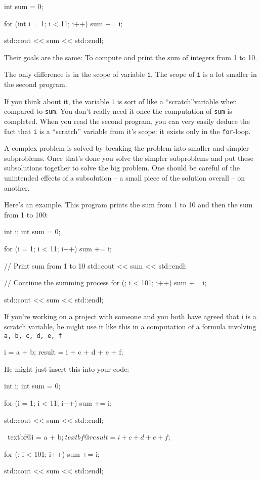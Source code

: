 \begin{console}
int sum = 0;

for (int i = 1; i < 11; i++)
{   
    sum += i;
}

std::cout << sum << std::endl;
\end{console}

Their goals are the same: To compute and print the sum of integers from
1 to 10.

The only difference is in the scope of variable \texttt{i}. The scope of
\texttt{i} is a lot smaller in the second program.

If you think about it, the variable \texttt{i} is sort of like a
``scratch''variable when compared to \texttt{sum}. You
don't really need it once the computation of \texttt{sum}
is completed. When you read the second program, you can very easily
deduce the fact that \texttt{i} is a ``scratch'' variable from
it's scope: it exists only in the \texttt{for}-loop.

A complex problem is solved by breaking the problem into smaller and
simpler subproblems. Once that's done you solve the
simpler subproblems and put these subsolutions together to solve the big
problem. One should be careful of the unintended effects of a
subsolution -- a small piece of the solution overall -- on another.

Here's an example. This program prints the sum from 1 to
10 and then the sum from 1 to 100:
\begin{console}
int i;
int sum = 0;

for (i = 1; i < 11; i++)
{   
    sum += i;
}

// Print sum from 1 to 10
std::cout << sum << std::endl;

// Continue the summing process
for (; i < 101; i++)
{   
    sum += i;
}

std::cout << sum << std::endl;
\end{console}
If you're working on a project with someone and you both
have agreed that i is a scratch variable, he might use it like this in a
computation of a formula involving \texttt{a, b, c, d, e, f}
\begin{console}
i = a + b;
result = i + c + d + e + f;
\end{console}
He might just insert this into your code:
\begin{console}[commandchars=\~\@\$]
int i;
int sum = 0;

for (i = 1; i < 11; i++)
{   
    sum += i;
}

std::cout << sum << std::endl;

~textbf@i = a + b;$
~textbf@result = i + c + d + e + f;$

for (; i < 101; i++)
{   
    sum += i;
}

std::cout << sum << std::endl;
\end{console}


